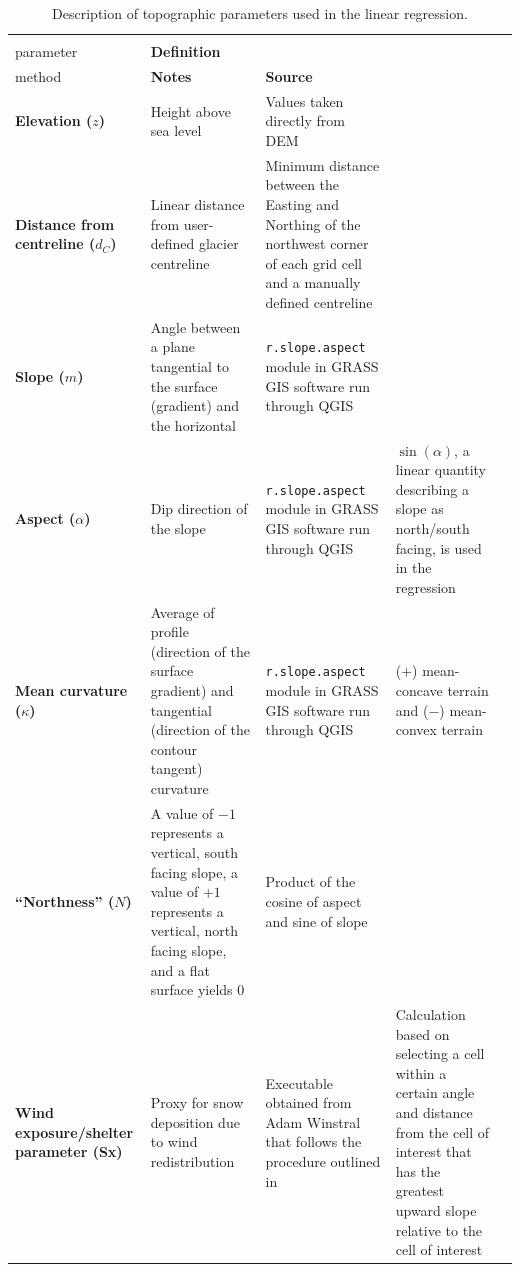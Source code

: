 \documentclass[twocolumn, letterpaper]{igs}
\begin{document}
\begin{landscape}
\begin{table}[H]
\leftskip=-5cm
\begin{threeparttable}
    \captionsetup{singlelinecheck=off, skip=4pt}
\caption{Description of topographic parameters used in the linear regression.}
\label{tab:TopoParams}
\begin{tabularx}{22cm}{XXXXX}

\midrule
\textbf{\begin{tabular}[c]{@{}l@{}}Topographic\\ parameter\end{tabular}} & \textbf{Definition} & \textbf{\begin{tabular}[c]{@{}l@{}}Calculation \\ method\end{tabular}} & \textbf{Notes} & \textbf{Source} \\ \midrule
\textbf{Elevation ($z$)} & Height above sea level & Values taken directly from DEM &  &  \\ \midrule
\textbf{Distance from centreline ($d_C$)} & Linear distance from user-defined glacier centreline & Minimum distance between the Easting and Northing of the northwest corner of each grid cell and a manually defined centreline &  &  \\ \midrule
\textbf{Slope ($m$)} & Angle between a plane tangential to the surface (gradient) and the horizontal & \texttt{r.slope.aspect} module in GRASS GIS software run through QGIS &  & \cite{Mitavsova1993, Hofierka2009, Olaya2009} \\ \midrule
\textbf{Aspect ($\alpha$)} & Dip direction of the slope & \texttt{r.slope.aspect} module in GRASS GIS software run through QGIS & $\sin(\alpha)$, a linear quantity describing a slope as north/south facing, is used in the regression & \cite{Mitavsova1993, Hofierka2009, Olaya2009} \\ \midrule
\textbf{Mean curvature ($\kappa$)} & Average of profile (direction of the surface gradient) and tangential (direction of the contour tangent) curvature & \texttt{r.slope.aspect} module in GRASS GIS software run through QGIS & ($+$) mean-concave terrain and ($-$) mean-convex terrain & \cite{Mitavsova1993, Hofierka2009, Olaya2009} \\ \midrule
\textbf{``Northness'' ($N$)} & A value of $-1$ represents a vertical, south facing slope, a value of $+1$ represents a vertical, north facing slope, and a flat surface yields 0 & Product of the cosine of aspect and sine of slope &  & \citep{Molotch2005} \\ \midrule
\textbf{Wind exposure/shelter parameter (Sx)} & Proxy for snow deposition due to wind redistribution & Executable obtained from Adam Winstral that follows the procedure outlined in \cite{Winstral2002} & Calculation based on selecting a cell within a certain angle and distance from the cell of interest that has the greatest upward slope relative to the cell of interest & \citep{Winstral2002}
\end{tabularx}
\end{threeparttable}
\end{table}
\end{landscape}
\end{document}
